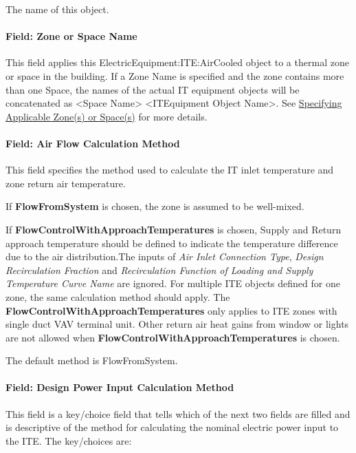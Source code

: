 The name of this object.

\paragraph{Field: Zone or Space Name}\label{iteq-field-zone-or-space-name-000}

This field applies this ElectricEquipment:ITE:AirCooled object to a thermal zone or space in the building. If a Zone Name is specified and the zone contains more than one Space, the names of the actual IT equipment objects will be concatenated as \textless{}Space Name\textgreater{} \textless{}ITEquipment Object Name\textgreater{}. See \hyperref[specifying-applicable-zones-or-spaces]{Specifying Applicable Zone(s) or Space(s)} for more details.

\paragraph{Field: Air Flow Calculation Method}\label{field-air-flow-calculation-method}

This field specifies the method used to calculate the IT inlet temperature and zone return air temperature.

If \textbf{FlowFromSystem} is chosen, the zone is assumed to be well-mixed.

If \textbf{FlowControlWithApproachTemperatures} is chosen, Supply and Return approach temperature should be defined to indicate the temperature difference due to the air distribution.The inputs of \textit{Air Inlet Connection Type}, \textit{Design Recirculation Fraction} and \textit{Recirculation Function of Loading and Supply Temperature Curve Name} are ignored. For multiple ITE objects defined for one zone, the same calculation method should apply. The \textbf{FlowControlWithApproachTemperatures} only applies to ITE zones with single duct VAV terminal unit. Other return air heat gains from window or lights are not allowed when \textbf{FlowControlWithApproachTemperatures} is chosen.

The default method is FlowFromSystem.

\paragraph{Field: Design Power Input Calculation Method}\label{field-design-power-input-calculation-method}

This field is a key/choice field that tells which of the next two fields are filled and is descriptive of the method for calculating the nominal electric power input to the ITE. The key/choices are:

